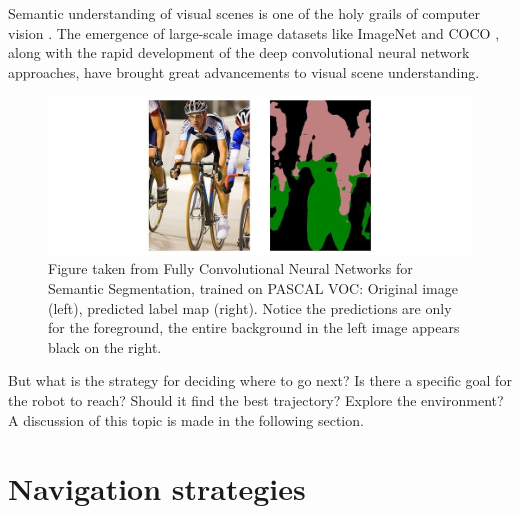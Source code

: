\documentclass[12pt,a4paper,table,dvipsnames,tikz]{report}
\newcommand{\acronym}{\MakeUppercase}
\begin{document}
	Semantic understanding of visual scenes is one of the holy grails of computer vision 
	\citep{Zhou_sem}. The emergence of large-scale image datasets like ImageNet \citep{Deng} 
	and \acronym{coco} \citep{coco}, along with the rapid development of the deep convolutional 
	neural network approaches, have brought great advancements to visual scene understanding.
	\\
	
	\begin{figure}[h!]
		\centering
		\includegraphics[width=\textwidth]{fcn}
		\caption{Figure taken from Fully Convolutional Neural Networks for Semantic 
			Segmentation, trained on \acronym{pascal voc}: Original image (left), predicted 
			label map (right). Notice the predictions are only for the foreground, the entire 
			background in the left image appears black on the right.}
		\label{fig:fcn}
	\end{figure}
	
	
	But what is the strategy for deciding where to go next? Is there a specific goal 
	for the robot to reach? Should it find the best trajectory? Explore the 
	environment? A discussion of this topic is made in the following section.
	\\
	
	\section{Navigation strategies}
	\label{sec:bg:goals}
	
\end{document}
